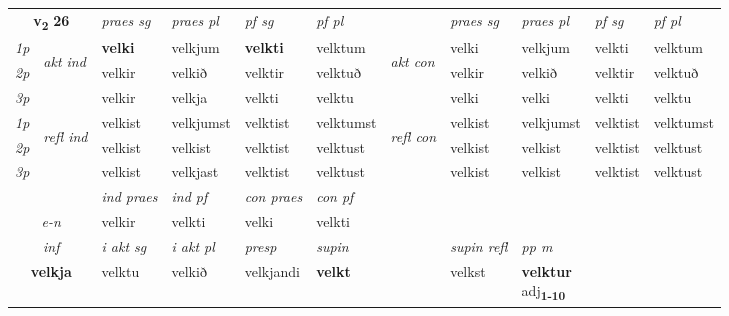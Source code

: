 \noindent
\begin{tabular}{lllllllllll} \toprule
\multicolumn{2}{c}{\textbf{v{\textsubscript{2}}} \Large{\textbf{26}}}  &  \textit{praes sg}  & \textit{praes pl}  &\textit{ pf sg} & \textit{pf pl} &  &  \textit{praes sg}  & \textit{praes pl}  & \textit{pf sg} & \textit{pf pl } \\*
	\cmidrule{3-6} \cmidrule{8-11}
 {\textit{1p}} & \multirow{3}{*}{\begin{turn}{90}\textit{akt ind}\end{turn}} & \textbf{velki} & velkjum & \textbf{velkti} & velktum & \multirow{3}{*}{\begin{turn}{90}\textit{akt con}\end{turn}} &velki & velkjum & velkti & velktum\\*
 {\textit{2p}} &  &  velkir  & velkið & velktir & velktuð & & velkir & velkið & velktir & velktuð \\*
{\textit{3p}} &  & velkir & velkja & velkti & velktu & & velki & velki& velkti & velktu \\*
\cmidrule{3-6} \cmidrule{8-11}
 {\textit{1p}} & \multirow{3}{*}{\begin{turn}{90}\textit{refl ind}\end{turn}}  & velkist & velkjumst & velktist & velktumst & \multirow{3}{*}{\begin{turn}{90}\textit{refl con}\end{turn}}  &velkist & velkjumst & velktist & velktumst \\*
 {\textit{2p}} &  & velkist & velkist & velktist & velktust & &velkist & velkist & velktist & velktust \\*
 {\textit{3p}}  & & velkist & velkjast & velktist & velktust & & velkist & velkist& velktist & velktust \\*
\cmidrule{3-6} \cmidrule{8-11}

   & &  \textit{ind praes} & \textit{ind pf} & \textit{con praes} & \textit{con pf} \\*
\multicolumn{2}{c}{ \textit{e-n} } & velkir & velkti & velki & velkti \\*

\cmidrule{3-9}
   \multicolumn{2}{c}{\textit{inf}}  & \textit{i akt sg} & \textit{i akt pl}   & \textit{presp} & \textit{supin} && \textit{supin refl} & \textit{pp m} \\*
  \multicolumn{2}{c}{\textbf{velkja}} & velktu  & velkið   & velkjandi &  \textbf{velkt} && velkst & \specialcell{\textbf{velktur} \\ adj\textbf{\textsubscript{1-10}}} \\*
\end{tabular}

